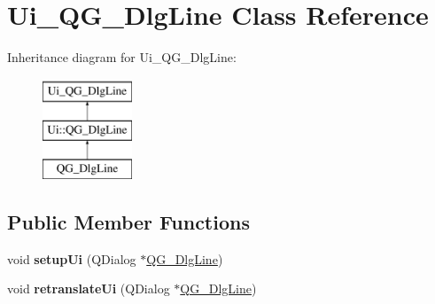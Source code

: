 \hypertarget{classUi__QG__DlgLine}{\section{Ui\-\_\-\-Q\-G\-\_\-\-Dlg\-Line Class Reference}
\label{classUi__QG__DlgLine}
}
Inheritance diagram for Ui\-\_\-\-Q\-G\-\_\-\-Dlg\-Line\-:\begin{figure}[H]
\begin{center}
\leavevmode
\includegraphics[height=3.000000cm]{classUi__QG__DlgLine}
\end{center}
\end{figure}
\subsection*{Public Member Functions}
\begin{DoxyCompactItemize}
\item 
\hypertarget{classUi__QG__DlgLine_a17de8df88ed489be731c3543a9a52c36}{void {\bfseries setup\-Ui} (Q\-Dialog $\ast$\hyperlink{classQG__DlgLine}{Q\-G\-\_\-\-Dlg\-Line})}\label{classUi__QG__DlgLine_a17de8df88ed489be731c3543a9a52c36}

\item 
\hypertarget{classUi__QG__DlgLine_a42946c032db67c2795f903e89c2896cd}{void {\bfseries retranslate\-Ui} (Q\-Dialog $\ast$\hyperlink{classQG__DlgLine}{Q\-G\-\_\-\-Dlg\-Line})}\label{classUi__QG__DlgLine_a42946c032db67c2795f903e89c2896cd}

\end{DoxyCompactItemize}

